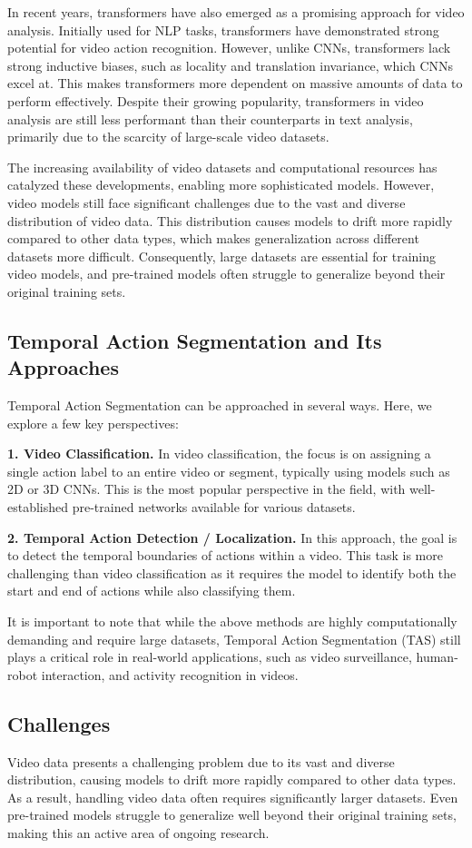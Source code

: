 In recent years, transformers have also emerged as a promising approach for video analysis. Initially used for NLP tasks, transformers have demonstrated strong potential for video action recognition. However, unlike CNNs, transformers lack strong inductive biases, such as locality and translation invariance, which CNNs excel at. This makes transformers more dependent on massive amounts of data to perform effectively. Despite their growing popularity, transformers in video analysis are still less performant than their counterparts in text analysis, primarily due to the scarcity of large-scale video datasets.

The increasing availability of video datasets and computational resources has catalyzed these developments, enabling more sophisticated models. However, video models still face significant challenges due to the vast and diverse distribution of video data. This distribution causes models to drift more rapidly compared to other data types, which makes generalization across different datasets more difficult. Consequently, large datasets are essential for training video models, and pre-trained models often struggle to generalize beyond their original training sets.

\subsection{Temporal Action Segmentation and Its Approaches}

Temporal Action Segmentation can be approached in several ways. Here, we explore a few key perspectives:

\noindent\textbf{1. Video Classification.} In video classification, the focus is on assigning a single action label to an entire video or segment, typically using models such as 2D or 3D CNNs. This is the most popular perspective in the field, with well-established pre-trained networks available for various datasets. 

\noindent\textbf{2. Temporal Action Detection / Localization.} In this approach, the goal is to detect the temporal boundaries of actions within a video. This task is more challenging than video classification as it requires the model to identify both the start and end of actions while also classifying them.

It is important to note that while the above methods are highly computationally demanding and require large datasets, Temporal Action Segmentation (TAS) still plays a critical role in real-world applications, such as video surveillance, human-robot interaction, and activity recognition in videos.

\subsection{Challenges}

Video data presents a challenging problem due to its vast and diverse distribution, causing models to drift more rapidly compared to other data types. As a result, handling video data often requires significantly larger datasets. Even pre-trained models struggle to generalize well beyond their original training sets, making this an active area of ongoing research.